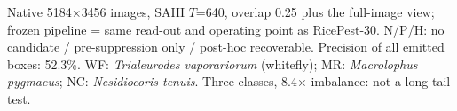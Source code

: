 \begin{table}[!htbp]
\centering
\scriptsize
\caption{Native-resolution source re-check on Yellow Sticky Traps (held-out test images, YOLO11n trained on native 640-pixel tiles).}
\label{tab:yst}
\par\smallskip\parbox{0.95\linewidth}{\footnotesize Native 5184$\times$3456 images, SAHI $T$=640, overlap 0.25 plus the full-image view; frozen pipeline = same read-out and operating point as RicePest-30. N/P/H: no candidate / pre-suppression only / post-hoc recoverable. Precision of all emitted boxes: 52.3\%. WF: \textit{Trialeurodes vaporariorum} (whitefly); MR: \textit{Macrolophus pygmaeus}; NC: \textit{Nesidiocoris tenuis}. Three classes, 8.4$\times$ imbalance: not a long-tail test.}
\end{table}
